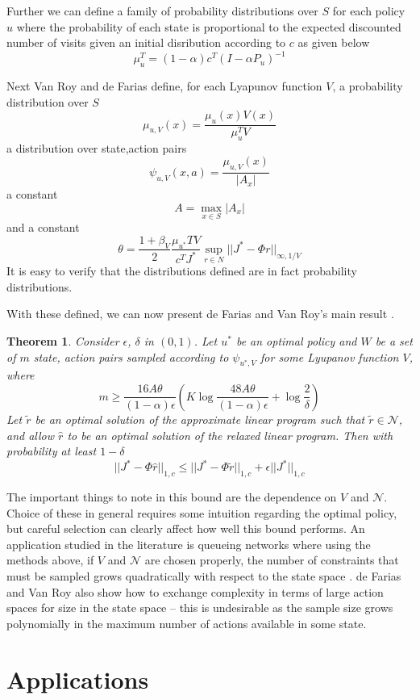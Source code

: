 \documentclass[12pt,reqno]{amsart}
\newtheorem{thm}{Theorem}[section]
\newcommand{\sN}{\mathcal{N}}
\numberwithin{equation}{section}
\begin{document}
Further we can define a family of probability distributions over $S$ for each policy $u$ where the probability of each state is proportional to the expected discounted number of visits given an initial disribution according to $c$ as given below
$$
\mu_u^{T} = (1-\alpha)c^T(I - \alpha P_u)^{-1}
$$

Next Van Roy and de Farias define, for each Lyapunov function $V$, a probability distribution over $S$
$$
\mu_{u,V}(x) = \frac{\mu_u(x)V(x)}{\mu_u^TV}
$$
a distribution over state,action pairs
$$
\psi_{u,V}(x,a) = \frac{\mu_{u,V}(x)}{|A_x|}
$$
a constant
$$A = \max_{x \in S} |A_x|$$
and a constant
$$
\theta = \frac{1 + \beta_V}{2} \frac{\mu_{u^*}T V} { c^T J^*} \sup_{r \in N} ||J^* - \Phi r||_{\infty, 1/V}
$$
It is easy to verify that the distributions defined are in fact probability distributions.

With these defined, we can now present de Farias and Van Roy's main result \cite{FV2}.

\begin{thm}
Consider $\epsilon$, $\delta$ in $(0,1)$. Let $u^*$ be an optimal policy and $W$ be a set of $m$ state, action pairs sampled according to $\psi_{u^*,V}$ for some Lyupanov function $V$, where
$$
m \geq \frac{16A\theta}{(1-\alpha)\epsilon} (K \log \frac{48 A\theta}{(1-\alpha)\epsilon} + \log \frac{2}{\delta})
$$
Let $\tilde{r}$ be an optimal solution of the approximate linear program such that $\tilde{r} \in \sN$, and allow $\hat{r}$ to be an optimal solution of the relaxed linear program. Then with probability at least $1-\delta$
$$
||J^* - \Phi \hat{r} ||_{1,c} \leq ||J^* - \Phi \tilde{r} ||_{1,c} + \epsilon ||J^*||_{1,c}
$$
\end{thm}

The important things to note in this bound are the dependence on $V$ and $\sN$. Choice of these in general requires some intuition regarding the optimal policy, but careful selection can clearly affect how well this bound performs. An application studied in the literature is queueing networks where using the methods above, if $V$ and $\sN$ are chosen properly, the number of constraints that must be sampled grows quadratically with respect to the state space \cite{FV2}. de Farias and Van Roy also show how to exchange complexity in terms of large action spaces for size in the state space -- this is undesirable as the sample size grows polynomially in the maximum number of actions available in some state.


\section{Applications}
\end{document}
